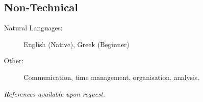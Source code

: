 \documentclass[10pt,a4paper]{article}
\newenvironment{indentsection}[1]%
{\begin{list}{}%
	{\setlength{\leftmargin}{#1}}%
	\item[]%
}
{\end{list}}
\begin{document}
\subsection*{Non-Technical}
\begin{indentsection}{\parindent}
\begin{description}
	\item[Natural Languages:]
	English (Native), Greek (Beginner)
    \item[Other:]
    Communication, time management, organisation, analysis.
\end{description}
\end{indentsection}
\vspace{2em}
\begin{center}
    \color{gray}\small\emph{References available upon request.}
\end{center}
\thispagestyle{empty}
\end{document}
